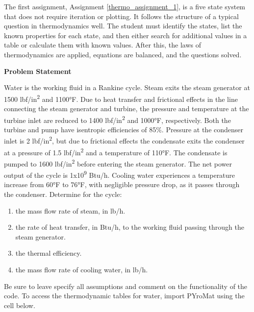 The first assignment, Assignment \ref{thermo_assignment_1}, is a five state system that does not require 
iteration or plotting. It follows the structure of a typical question in thermodynamics well. The student 
must identify the states, list the known properties for each state, and then either search for additional 
values in a table or calculate them with known values. After this, the laws of thermodynamics are applied, 
equations are balanced, and the questions solved.

\label{thermo_assignment_1}

\begin{tcolorbox}[breakable, enhanced jigsaw, title=ME 513: Assignment \ref{thermo_assignment_1}, 
    colframe=ksu-purple, colback=ksu-gray]

    \textbf{Problem Statement}
    \parindent15pt

    Water is the working fluid in a Rankine cycle. Steam exits the steam generator at 1500 
    lbf/in\textsuperscript{2}  and 1100°F. Due to heat transfer and frictional effects in 
    the line connecting the steam generator and turbine, the pressure and temperature at the 
    turbine inlet are reduced to 1400 lbf/in\textsuperscript{2} and 1000°F, respectively. Both the 
    turbine and pump have isentropic efficiencies of 85\%. Pressure at the condenser inlet 
    is 2 lbf/in\textsuperscript{2}, but due to frictional effects the condensate exits the 
    condenser at a pressure of 1.5 lbf/in\textsuperscript{2} and a temperature of 110°F. The 
    condensate is pumped to 1600 lbf/in\textsuperscript{2} before entering the steam generator. 
    The net power output of the cycle is 1x10\textsuperscript{9} Btu/h. Cooling water experiences 
    a temperature increase from 60°F to 76°F, with negligible pressure drop, as it passes 
    through the condenser. Determine for the cycle:

    \begin{enumerate}
        \item the mass flow rate of steam, in lb/h.
        \item the rate of heat transfer, in Btu/h, to the working fluid passing through the steam 
        generator. 
        \item the thermal efficiency.
        \item the mass flow rate of cooling water, in lb/h.
    \end{enumerate}

    Be sure to leave specify all assumptions and comment on the functionality of the code. 
    To access the thermodynamic tables for water, import PYroMat using the cell below.


\end{tcolorbox}
